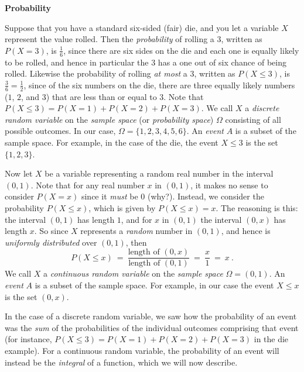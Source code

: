 \par\noindent\textbf{\large{Probability}}\normalsize\smallskip

Suppose that you have a standard six-sided (fair) die, and you let a variable $X$ represent the value rolled. Then the
\emph{probability} of rolling a $3$, written as $P(X=3)$, is $\frac{1}{6}$, since there are six sides on the die and
each one is equally likely to be rolled, and hence in particular the $3$ has a one out of six chance of being rolled.
Likewise the probability of rolling \emph{at most} a $3$, written as $P(X \le 3)$, is $\frac{3}{6} = \frac{1}{2}$,
since of the six numbers on the die, there are three equally likely numbers ($1$, $2$, and $3$) that are less than or
equal to $3$. Note that $P(X \le 3) = P(X=1) + P(X=2) + P(X=3)$. We call $X$ a \emph{discrete random variable} on the
\emph{sample space} (or \emph{probability space}) $\Omega$ consisting of all possible outcomes. In our case,
$\Omega = \lbrace 1,2,3,4,5,6 \rbrace$.
An \emph{event} $A$ is a subset of the sample space. For example, in the case of the die, the event $X \le 3$ is the set
$\lbrace 1,2,3 \rbrace$.

Now let $X$ be a variable representing a random real number in the interval $(0,1)$. 
Note that for any real number
$x$ in $(0,1)$, it makes no sense to consider $P(X=x)$ since it \emph{must} be $0$ (why?). 
Instead, we consider the probability $P(X \le x)$, which is given by $P(X \le x) = x$. The reasoning is this: the interval $(0,1)$ has length $1$,
and for $x$ in $(0,1)$ the interval $(0,x)$ has length $x$. So since $X$ represents a \emph{random} number in $(0,1)$,
and hence is \emph{uniformly distributed} over $(0,1)$, then
\begin{displaymath}
 P(X \le x) ~=~ \frac{\text{length of $(0,x)$}}{\text{length of $(0,1)$}} ~=~ \frac{x}{1} ~=~ x ~.
\end{displaymath}
We call $X$ a \emph{continuous random variable} on the \emph{sample space} $\Omega = (0,1)$. An \emph{event} $A$ is a
subset of the sample space. For example, in our case the event $X \le x$ is the set $(0,x)$.

In the case of a discrete random variable, we saw how the probability of an event was the \emph{sum} of the
probabilities of the individual outcomes comprising that event 
(for instance, $P(X \le 3) = P(X=1) + P(X=2) + P(X=3)$ in the die example). 
For a continuous random variable, the probability of an event will instead be the \emph{integral} of a
function, which we will now describe.

